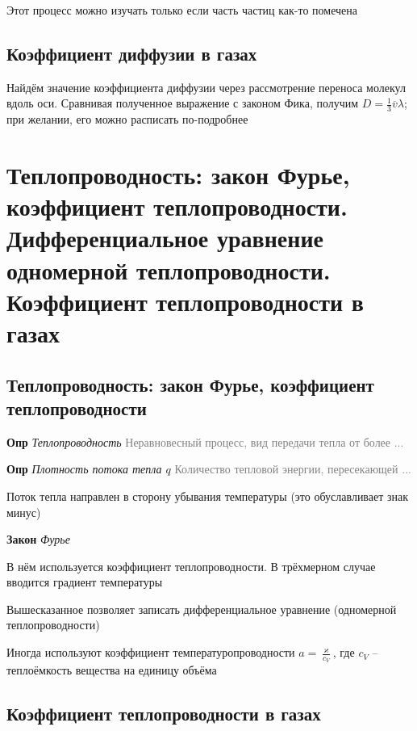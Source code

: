 \documentclass[a4paper, 14pt]{article}
\begin{document}
    Этот процесс можно изучать только если часть частиц как-то помечена
    
    \subsection{Коэффициент диффузии в газах}
    
    Найдём значение коэффициента диффузии через рассмотрение переноса молекул вдоль оси.
    Сравнивая полученное выражение с законом Фика, получим $D = \frac{1}{3} \overline{v}\lambda$; при
    желании, его можно расписать по-подробнее
    
    \section{Теплопроводность: закон Фурье, коэффициент теплопроводности. Дифференциальное уравнение одномерной
    теплопроводности.
    Коэффициент теплопроводности в газах}
    
    \subsection{Теплопроводность: закон Фурье, коэффициент теплопроводности}
    
    \textbf{Опр} \textit{Теплопроводность} \textcolor{gray}{Неравновесный процесс, вид передачи тепла от более ...}
    
    \textbf{Опр} \textit{Плотность потока тепла $q$} \textcolor{gray}{Количество тепловой энергии, пересекающей ...}
    
    Поток тепла направлен в сторону убывания температуры (это обуславливает знак минус)
    
    \textbf{Закон} \textit{Фурье}
    
    В нём используется коэффициент теплопроводности.
    В трёхмерном случае вводится градиент температуры
    
    Вышесказанное позволяет записать дифференциальное уравнение (одномерной теплопроводности)
    
    Иногда используют коэффициент температуропроводности $a = \frac{\varkappa}{c_V}$, где $c_V$ -- теплоёмкость
    вещества на единицу объёма
    
    \subsection{Коэффициент теплопроводности в газах}
    
\end{document}
